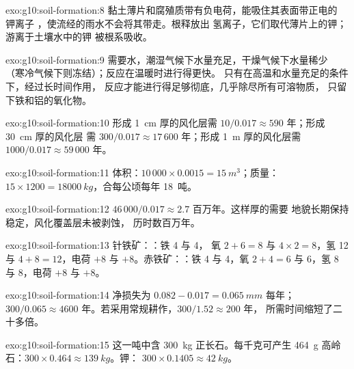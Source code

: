 \begin{solution}{exo:g10:soil-formation:8}
黏土薄片和腐殖质带有负电荷，能吸住其表面带正电的
钾离子 ，使流经的雨水不会将其带走。根释放出
氢离子，它们取代薄片上的钾；
游离于土壤水中的钾
被根系吸收。
\end{solution}

\begin{solution}{exo:g10:soil-formation:9}
需要水，潮湿气候下水量充足，干燥气候下水量稀少
（寒冷气候下则冻结）；反应在温暖时进行得更快。
只有在高温和水量充足的条件下，经过长时间作用，
反应才能进行得足够彻底，几乎除尽所有可溶物质，
只留下铁和铝的氧化物。
\end{solution}

\begin{solution}{exo:g10:soil-formation:10}
形成 \qty{1}{cm} 厚的风化层需 $10/0.017 \approx 590$ 年；形成 \qty{30}{cm} 厚的风化层
需 $300/0.017 \approx 17\,600$ 年；形成 \qty{1}{m} 厚的风化层需 $1000/0.017 \approx 59\,000$ 年。
\end{solution}

\begin{solution}{exo:g10:soil-formation:11}
体积：$10\,000 \times 0.0015 = \qty{15}{m^3}$；质量：$15 \times 1200 =
\qty{18000}{kg}$，合每公顷每年 \num{18}~吨。
\end{solution}

\begin{solution}{exo:g10:soil-formation:12}
$46\,000/0.017 \approx 2.7$ 百万年。这样厚的需要
地貌长期保持稳定，风化覆盖层未被剥蚀，
历时数百万年。
\end{solution}

\begin{solution}{exo:g10:soil-formation:13}
针铁矿：：铁 4 与 4，
氧 $2 + 6 = 8$ 与 $4 \times 2 = 8$，氢 12 与 $4 + 8 = 12$，电荷
$+8$ 与 $+8$。赤铁矿：：铁 4
与 4，氧 $2 + 4 = 6$ 与 6，氢 8 与 8，电荷 $+8$ 与 $+8$。
\end{solution}

\begin{solution}{exo:g10:soil-formation:14}
净损失为 $0.082 - 0.017 = \qty{0.065}{mm}$ 每年；$300/0.065 \approx 4600$
年。若采用常规耕作，$300/1.52 \approx 200$ 年，
所需时间缩短了二十多倍。
\end{solution}

\begin{solution}{exo:g10:soil-formation:15}
这一吨中含 \qty{300}{kg} 正长石。每千克可产生
\qty{464}{g} 高岭石：$300 \times 0.464 \approx \qty{139}{kg}$。钾：
$300 \times 0.1405 \approx \qty{42}{kg}$。
\end{solution}

